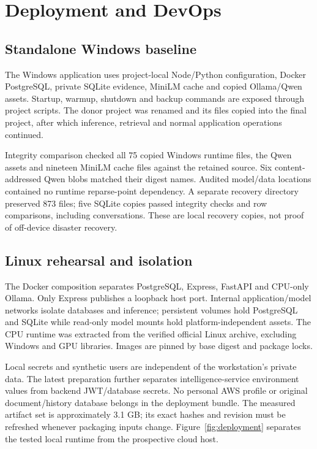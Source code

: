 \chapter{Deployment and DevOps}
\section{Standalone Windows baseline}
The Windows application uses project-local Node/Python configuration, Docker PostgreSQL, private SQLite evidence, MiniLM cache and copied Ollama/Qwen assets. Startup, warmup, shutdown and backup commands are exposed through project scripts. The donor project was renamed and its files copied into the final project, after which inference, retrieval and normal application operations continued.

Integrity comparison checked all 75 copied Windows runtime files, the Qwen assets and nineteen MiniLM cache files against the retained source. Six content-addressed Qwen blobs matched their digest names. Audited model/data locations contained no runtime reparse-point dependency. A separate recovery directory preserved 873 files; five SQLite copies passed integrity checks and row comparisons, including conversations. These are local recovery copies, not proof of off-device disaster recovery.
\section{Linux rehearsal and isolation}
The Docker composition separates PostgreSQL, Express, FastAPI and CPU-only Ollama. Only Express publishes a loopback host port. Internal application/model networks isolate databases and inference; persistent volumes hold PostgreSQL and SQLite while read-only model mounts hold platform-independent assets. The CPU runtime was extracted from the verified official Linux archive, excluding Windows and GPU libraries. Images are pinned by base digest and package locks.

Local secrets and synthetic users are independent of the workstation's private data. The latest preparation further separates intelligence-service environment values from backend JWT/database secrets. No personal AWS profile or original document/history database belongs in the deployment bundle. The measured artifact set is approximately 3.1 GB; its exact hashes and revision must be refreshed whenever packaging inputs change.
Figure~\ref{fig:deployment} separates the tested local runtime from the prospective cloud host.

